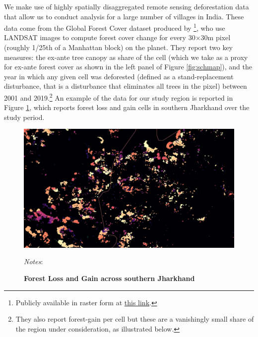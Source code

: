 \documentclass[12pt,reqno]{article}
\begin{document}
We make use of highly spatially disaggregated remote sensing deforestation data that allow us to conduct analysis for a large number of villages in India. These data come from the Global Forest Cover dataset produced by \textcite{Hansen2013-vk}\footnote{ Publicly available in raster form at  \href{https://earthenginepartners.appspot.com/science-2013-global-forest/download_v1.7.html}{this link}.}, who use LANDSAT images to compute forest cover change for every 30$\times$30m pixel (roughly 1/25th of a Manhattan block) on the planet. They report two key measures: the ex-ante tree canopy as share of the cell (which we take as a proxy for ex-ante forest cover as shown in the left panel of Figure \ref{fig:schmap}), and the year in which any given cell was deforested (defined as a stand-replacement disturbance, that is a disturbance that eliminates all trees in the pixel) between 2001 and 2019.\footnote{They also report forest-gain per cell but these are a vanishingly small share of the region under consideration, as illustrated below.} An example of the data for our study region is reported in Figure \ref{fig:lossgain}, which reports forest loss and gain cells in southern Jharkhand over the study period. 


\begin{figure}[htbp!]
\begin{center}
\begin{minipage}{1 \linewidth}
\caption{\textbf{Forest Loss and Gain across southern Jharkhand}\label{fig:lossgain}}	\centerline{\includegraphics[width=6 in,angle=0]{Figs/loss_v_gain.pdf}}
\smallskip
\scriptsize
\emph{Notes}: 
\end{minipage}
\end{center}
\end{figure}
\end{document}

